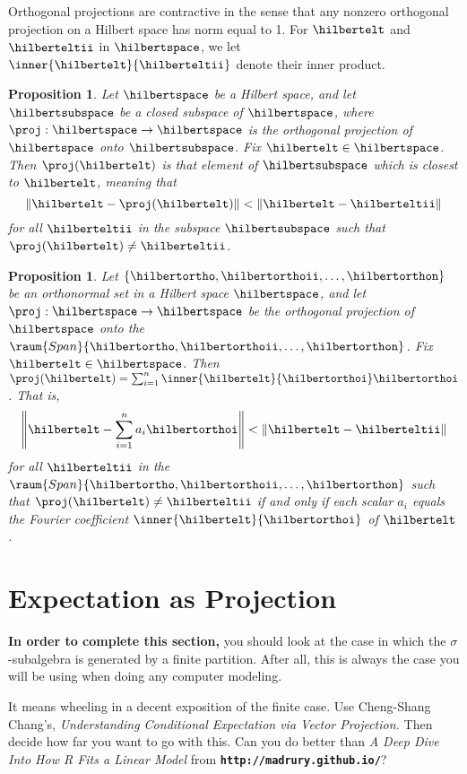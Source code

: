 \documentclass[
twoside=true,
paper=letter,
fontsize=11pt,
pagesize=auto,
leqno,
openany,
headsepline,
overfullrule,
]{scrbook}
\theoremstyle{plain}
\theoremstyle{plain}
\newtheorem{prop}[thm]{Proposition}
\theoremstyle{definition}
\theoremstyle{bfnoteitalic}
\theoremstyle{bfnoteroman}
\newcommand{\cf}[1]{\textbf{\texttt{#1}}}
\newcommand{\textsigma}{\hbox{\large{$\sigma$}}\kern-1pt}
\newcommand{\norm}[1]{\left\Vert#1\right\Vert}
\begin{document}
Orthogonal projections are contractive in the sense that any nonzero orthogonal projection on a Hilbert space has norm equal to 1.
For $\hilbertelt$ and $\hilberteltii$ in $\hilbertspace$, we let 
$\inner{\hilbertelt}{\hilberteltii}$ denote their inner product.

\begin{prop}
Let $\hilbertspace$ be a Hilbert space, and let $\hilbertsubspace$ be a closed subspace of $\hilbertspace$, where $\proj :\hilbertspace \to \hilbertspace$ is the orthogonal projection of $\hilbertspace$ onto $\hilbertsubspace$. Fix $\hilbertelt\in \hilbertspace$. Then $\proj(\hilbertelt)$ is that element of $\hilbertsubspace$ which is closest to $\hilbertelt$, meaning that
\[
\norm{\hilbertelt-\proj(\hilbertelt)}<\norm{\hilbertelt-\hilberteltii} 
\]
for all $\hilberteltii$ in the subspace $\hilbertsubspace$ such that 
$\proj(\hilbertelt)\neq \hilberteltii$.
\end{prop}



\begin{prop}
Let $\{\hilbertortho, \hilbertorthoii, \ldots, \hilbertorthon\}$ be an orthonormal set in a Hilbert space $\hilbertspace$, and let $\proj:\hilbertspace \to \hilbertspace$ be the orthogonal projection of $\hilbertspace$ onto the 
$\raum{Span}\{\hilbertortho, \hilbertorthoii, \ldots, \hilbertorthon\}$. 
Fix $\hilbertelt\in\hilbertspace$. Then 
$\proj(\hilbertelt) = \sum_{i=1}^{n} \inner{\hilbertelt}{\hilbertorthoi}\hilbertorthoi$. 
That is, 
\[
\norm{\hilbertelt - \sum_{i=1}^n a_i \hilbertorthoi} < 
\norm{\hilbertelt-\hilberteltii}
\]
for all 
$\hilberteltii$ in the $\raum{Span}\{\hilbertortho, \hilbertorthoii, \ldots, \hilbertorthon\}$ 
such that $\proj(\hilbertelt)\neq \hilberteltii$ 
if and only if  each scalar  $a_i$ equals the Fourier coefficient 
$\inner{\hilbertelt}{\hilbertorthoi}$ of $\hilbertelt$. 
\end{prop}





\section{Expectation as Projection}
\begin{quoting}
\textbf{In order to complete this section,}
you should look at the case in which the \textsigma\hyp{}subalgebra is generated by a finite partition.  After all, this is always the case you will be using when doing any computer modeling.

It means wheeling in a decent exposition of the finite case. Use Cheng\hyp{}Shang Chang's,
\textsl{Understanding Conditional Expectation via Vector Projection.}
Then decide how far you want to go with this. Can you do better than
\textsl{A Deep Dive Into How R Fits a Linear Model} from
\cf{http://madrury.github.io/}?
\end{quoting}
\end{document}
